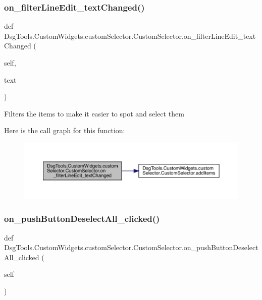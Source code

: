 \subsubsection{\texorpdfstring{on\+\_\+filter\+Line\+Edit\+\_\+text\+Changed()}{on\_filterLineEdit\_textChanged()}}
{\footnotesize\ttfamily def Dsg\+Tools.\+Custom\+Widgets.\+custom\+Selector.\+Custom\+Selector.\+on\+\_\+filter\+Line\+Edit\+\_\+text\+Changed (\begin{DoxyParamCaption}\item[{}]{self,  }\item[{}]{text }\end{DoxyParamCaption})}

\begin{DoxyVerb}Filters the items to make it easier to spot and select them
\end{DoxyVerb}
 Here is the call graph for this function\+:
\nopagebreak
\begin{figure}[H]
\begin{center}
\leavevmode
\includegraphics[width=350pt]{class_dsg_tools_1_1_custom_widgets_1_1custom_selector_1_1_custom_selector_ac2e49650f5a2fe07de9093342a84f199_cgraph}
\end{center}
\end{figure}
\mbox{\label{class_dsg_tools_1_1_custom_widgets_1_1custom_selector_1_1_custom_selector_accf01df90f08ef45db4669da7d15c205}} 
\subsubsection{\texorpdfstring{on\+\_\+push\+Button\+Deselect\+All\+\_\+clicked()}{on\_pushButtonDeselectAll\_clicked()}}
{\footnotesize\ttfamily def Dsg\+Tools.\+Custom\+Widgets.\+custom\+Selector.\+Custom\+Selector.\+on\+\_\+push\+Button\+Deselect\+All\+\_\+clicked (\begin{DoxyParamCaption}\item[{}]{self }\end{DoxyParamCaption})}


